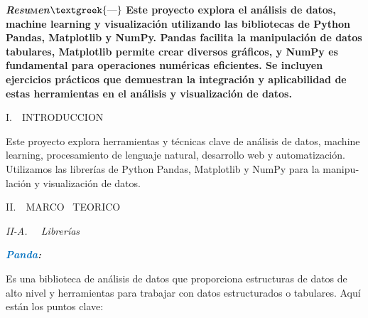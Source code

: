 \documentclass[letterpaper]{article}
\begin{document}
\begin{multicols}{2}

\bigskip


\bigskip

{
\textbf{\textit{Resu}}\textbf{\textsc{m}}\textbf{\textit{en}}\textbf{$\text{\textgreek{—}}$} \textbf{Este proyecto
explora el análisis de datos, machine learning y visualización utilizando las bibliotecas de Python Pandas, Matplotlib
y NumPy. Pandas facilita la manipulación de datos tabulares, Matplotlib permite crear diversos gráficos, y NumPy es
fundamental para operaciones numéricas eficientes. Se incluyen ejercicios prácticos que demuestran la integración y
aplicabilidad de estas herramientas en el análisis y visualización de datos.}}


\bigskip


\bigskip

{
I.\ \ INTRODUCCION}

{
\foreignlanguage{spanish}{Este proyecto explora herramientas y técnicas clave de análisis de datos, machine learning,
procesamiento de lenguaje natural, desarrollo web y automatización. Utilizamos las librerías de Python Pandas,
Matplotlib y NumPy para la manipulación y visualización de datos.}}


\bigskip


\bigskip


\bigskip


\bigskip


\bigskip


\bigskip


\bigskip


\bigskip


\bigskip


\bigskip


\bigskip


\bigskip


\bigskip


\bigskip


\bigskip


\bigskip

{
II.\ \ MARCO \ TEORICO}

{
\textit{II-A. \ \ Librerías}}

{
\foreignlanguage{spanish}{\textbf{\textit{\textcolor[HTML]{0070C0}{Panda}}}}\foreignlanguage{spanish}{\textbf{\textit{:}}}}

{
\foreignlanguage{spanish}{Es una biblioteca de análisis de datos que proporciona estructuras de datos de alto nivel y
herramientas para trabajar con datos estructurados o tabulares. Aquí están los puntos clave:}}



\end{multicols}
\end{document}
